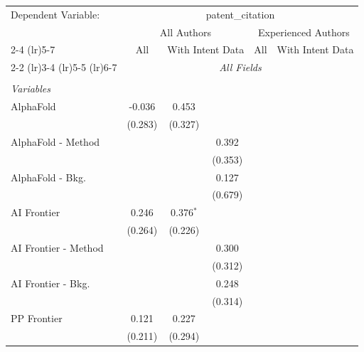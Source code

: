 \begingroup
\centering
\begin{tabular}{lcccccc}
   \tabularnewline \midrule \midrule
   Dependent Variable: & \multicolumn{6}{c}{patent\_citation}\\
 & \multicolumn{3}{c}{All Authors} & \multicolumn{3}{c}{Experienced Authors} \\
\cmidrule(lr){2-4} \cmidrule(lr){5-7}
 & \multicolumn{1}{c}{All} & \multicolumn{2}{c}{With Intent Data} & \multicolumn{1}{c}{All} & \multicolumn{2}{c}{With Intent Data} \\
\cmidrule(lr){2-2} \cmidrule(lr){3-4} \cmidrule(lr){5-5} \cmidrule(lr){6-7}
 & \multicolumn{6}{c}{\textit{All Fields}} \\ \\
   \emph{Variables}\\
   AlphaFold            & -0.036   & 0.453       &              &       &       &   \\   
                        & (0.283)  & (0.327)     &              &       &       &   \\   
   AlphaFold - Method   &          &             & 0.392        &       &       &   \\   
                        &          &             & (0.353)      &       &       &   \\   
   AlphaFold - Bkg.     &          &             & 0.127        &       &       &   \\   
                        &          &             & (0.679)      &       &       &   \\   
   AI Frontier          & 0.246    & 0.376$^{*}$ &              &       &       &   \\   
                        & (0.264)  & (0.226)     &              &       &       &   \\   
   AI Frontier - Method &          &             & 0.300        &       &       &   \\   
                        &          &             & (0.312)      &       &       &   \\   
   AI Frontier - Bkg.   &          &             & 0.248        &       &       &   \\   
                        &          &             & (0.314)      &       &       &   \\   
   PP Frontier          & 0.121    & 0.227       &              &       &       &   \\   
                        & (0.211)  & (0.294)     &              &       &       &   \\   

\end{tabular}
